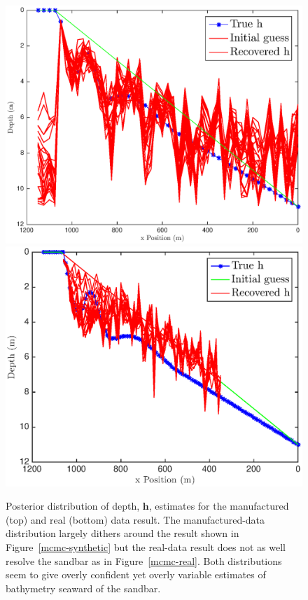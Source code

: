 \begin{figure}[H]
\center
\includegraphics[scale=0.46]{img/MCMC-posterior-manufactured}
\includegraphics[scale=0.46]{img/MCMC-posterior-real}
\caption{Posterior distribution of depth, $\mathbf{h}$, estimates for the manufactured (top) and real (bottom) data result. The manufactured-data distribution largely dithers around the result shown in Figure~\ref{mcmc-synthetic} but the real-data result does not as well resolve the sandbar as in Figure~\ref{mcmc-real}. Both distributions seem to give overly confident yet overly variable estimates of bathymetry seaward of the sandbar.}
\label{mcmc-posterior}
\end{figure}


